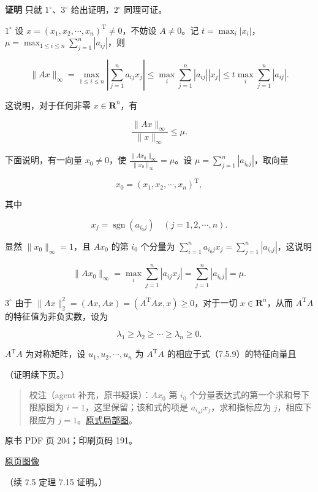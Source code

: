 \textbf{证明} 只就 \(1^\circ\)、\(3^\circ\) 给出证明，\(2^\circ\) 同理可证。

\(1^\circ\) 设 \(x=(x_1,x_2,\cdots,x_n)^{\mathrm T}\neq0\)，不妨设 \(A\neq0\)。记 \(t=\max_i|x_i|\)，\(\mu=\max_{1\leqslant i\leqslant n}\sum_{j=1}^{n}|a_{ij}|\)，则

\[
\|Ax\|_\infty
=\max_{1\leqslant i\leqslant n}\left|\sum_{j=1}^{n}a_{ij}x_j\right|
\leqslant\max_i\sum_{j=1}^{n}|a_{ij}||x_j|
\leqslant t\max_i\sum_{j=1}^{n}|a_{ij}|.
\]

这说明，对于任何非零 \(x\in\mathbf R^n\)，有

\[
\frac{\|Ax\|_\infty}{\|x\|_\infty}\leqslant\mu.
\tag{7.5.8}
\]

下面说明，有一向量 \(x_0\neq0\)，使 \(\frac{\|Ax_0\|_\infty}{\|x_0\|_\infty}=\mu\)。设 \(\mu=\sum_{j=1}^{n}|a_{i_0j}|\)，取向量

\[
x_0=(x_1,x_2,\cdots,x_n)^{\mathrm T},
\]

其中

\[
x_j=\operatorname{sgn}(a_{i_0j})\quad(j=1,2,\cdots,n).
\]

显然 \(\|x_0\|_\infty=1\)，且 \(Ax_0\) 的第 \(i_0\) 个分量为 \(\sum_{i=1}^{n}a_{i_0j}x_j=\sum_{j=1}^{n}|a_{i_0j}|\)，这说明

\[
\|Ax_0\|_\infty=\max_i\sum_{j=1}^{n}|a_{ij}x_j|=\sum_{j=1}^{n}|a_{i_0j}|=\mu.
\]

\(3^\circ\) 由于 \(\|Ax\|_2^2=(Ax,Ax)=(A^{\mathrm T}Ax,x)\geqslant0\)，对于一切 \(x\in\mathbf R^n\)，从而 \(A^{\mathrm T}A\) 的特征值为非负实数，设为

\[
\lambda_1\geqslant\lambda_2\geqslant\cdots\geqslant\lambda_n\geqslant0.
\tag{7.5.9}
\]

\(A^{\mathrm T}A\) 为对称矩阵，设 \(u_1,u_2,\cdots,u_n\) 为 \(A^{\mathrm T}A\) 的相应于式（7.5.9）的特征向量且

（证明续下页。）

\begin{quote}
校注（agent 补充，原书疑误）：\(Ax_0\) 第 \(i_0\) 个分量表达式的第一个求和号下限原图为 \(i=1\)，这里保留；该和式的项是 \(a_{i_0j}x_j\)，求和指标应为 \(j\)，相应下限应为 \(j=1\)。\href{verified/assets/ch07b/203-sum-index.png}{原式局部图}。
\end{quote}

\clearpage

原书 PDF 页 204；印刷页码 191。

\href{source-images/pdf-204.jpeg}{原页图像}

（续 7.5 定理 7.15 证明。）

